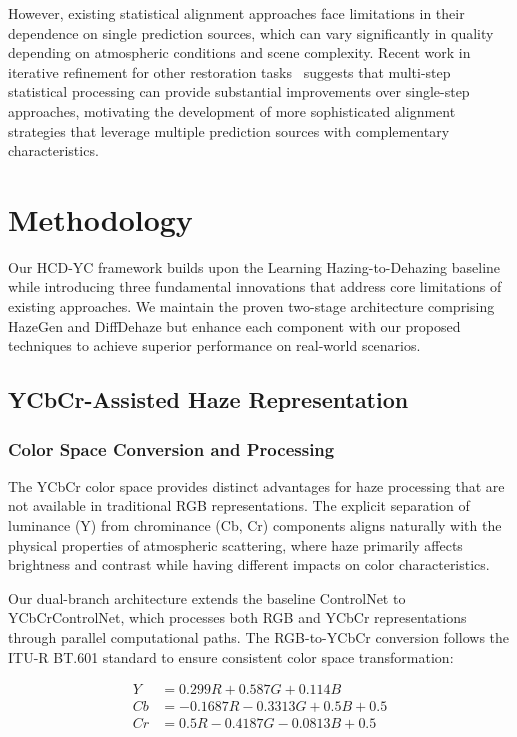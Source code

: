 \documentclass{article}
\begin{document}
However, existing statistical alignment approaches face limitations in their dependence on single prediction sources, which can vary significantly in quality depending on atmospheric conditions and scene complexity. Recent work in iterative refinement for other restoration tasks~\cite{zhang2023iterative} suggests that multi-step statistical processing can provide substantial improvements over single-step approaches, motivating the development of more sophisticated alignment strategies that leverage multiple prediction sources with complementary characteristics.

\section{Methodology}

Our HCD-YC framework builds upon the Learning Hazing-to-Dehazing baseline while introducing three fundamental innovations that address core limitations of existing approaches. We maintain the proven two-stage architecture comprising HazeGen and DiffDehaze but enhance each component with our proposed techniques to achieve superior performance on real-world scenarios.

\subsection{YCbCr-Assisted Haze Representation}

\subsubsection{Color Space Conversion and Processing}

The YCbCr color space provides distinct advantages for haze processing that are not available in traditional RGB representations. The explicit separation of luminance (Y) from chrominance (Cb, Cr) components aligns naturally with the physical properties of atmospheric scattering, where haze primarily affects brightness and contrast while having different impacts on color characteristics.

Our dual-branch architecture extends the baseline ControlNet to YCbCrControlNet, which processes both RGB and YCbCr representations through parallel computational paths. The RGB-to-YCbCr conversion follows the ITU-R BT.601 standard to ensure consistent color space transformation:

\begin{align}
Y &= 0.299R + 0.587G + 0.114B \\
Cb &= -0.1687R - 0.3313G + 0.5B + 0.5 \\
Cr &= 0.5R - 0.4187G - 0.0813B + 0.5
\end{align}
\end{document}
